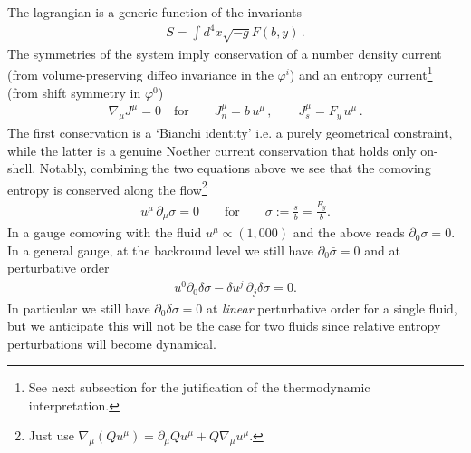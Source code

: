 The lagrangian is a generic function of the invariants
\begin{align}\label{eq:eft_action_exact}
    S=\int d^4x \sqrt{-g} F(b,y)\,.
\end{align}
The symmetries of the system imply conservation of a number density current (from volume-preserving diffeo invariance in the $\varphi^i$) and an entropy current\footnote{\label{fn:thermodynamic_interpretation}See next subsection for the jutification of the thermodynamic interpretation.} (from shift symmetry in $\varphi^0$)
\begin{align}\label{eq:noether_currents_nonbaro}
    \nabla_\mu J^\mu=0\quad\text{for}\qquad J_n^\mu = b\, u^\mu\,,\qquad J_s^\mu = F_y \,u^\mu\,.
\end{align}
The first conservation is a `Bianchi identity' i.e. a purely geometrical constraint, while the latter is a genuine Noether current conservation that holds only on-shell.
Notably, combining the two equations above we see that the comoving entropy is conserved along the flow\footnote{Just use $\nabla_\mu(Qu^\mu)=\partial_\mu Q u^\mu+Q\nabla_\mu u^\mu$.}
\begin{align}\label{eq:comoving_entropy_conserved_along_flow}
    u^\mu \,\partial_\mu \sigma=0\qquad\text{for}\qquad \sigma:=\frac{s}{b}=\frac{F_y}{b}.
\end{align}
In a gauge comoving with the fluid $u^\mu\propto (1,000)$ and the above reads $\partial_0\sigma=0$.
In a general gauge, at the backround level we still have $\partial_0\bar{\sigma}=0$ and at perturbative order
\begin{align}\label{eq:entropy_conservation_perturbative}
    u^0\partial_0{\delta \sigma}-\delta u^j\, \partial_j\delta\sigma=0.
\end{align}
In particular we still have $\partial_0\delta\sigma=0$ at \emph{linear} perturbative order for a single fluid, but we anticipate this will not be the case for two fluids since relative entropy perturbations will become dynamical.

